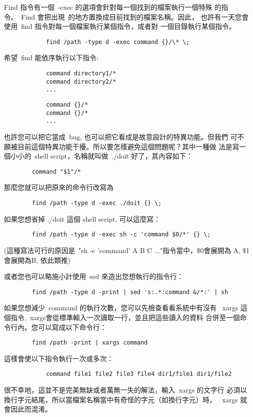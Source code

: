 \documentclass{article}
\begin{document}
\begin{CJK*}{Bg5}{ming}
	Find 指令有一個~-exec 的選項會針對每一個找到的檔案執行一個特殊
        的指令。~Find 會把出現~{}的地方置換成目前找到的檔案名稱。因此，
        也許有一天您會使用~find 指令對每一個檔案執行某個指令，或者對
        一個目錄執行某個指令。
\begin{verbatim}
	        find /path -type d -exec command {}/\* \;
\end{verbatim}
	希望~find 能依序執行以下指令:
\begin{verbatim}
	        command directory1/*
	        command directory2/*
	        ...
\end{verbatim}
\begin{verbatim}
	        command {}/*
	        command {}/*
	        ...
\end{verbatim}
	也許您可以把它當成~bug, 也可以把它看成是故意設計的特異功能。但我們
	可不願被目前這個特異功能干擾。所以要怎樣避免這個問題呢？其中一種做
	法是寫一個小小的~shell script，名稱就叫做~./doit 好了，其內容如下：
\begin{verbatim}
		command "$1"/*
\end{verbatim}
	那麼您就可以把原來的命令行改寫為
\begin{verbatim}
		find /path -type d -exec ./doit {} \;
\end{verbatim}
	如果您想省掉 ./doit 這個 shell script, 可以這麼寫：
\begin{verbatim}
		find /path -type d -exec sh -c 'command $0/*' {} \;
\end{verbatim}
	(這種寫法可行的原因是~"sh -c 'command' A B C ..."指令當中，\$0會展開為
	A, \$1會展開為B, 依此類推)

	或者您也可以略施小計使用~sed 來造出您想執行的指令行：
\begin{verbatim}
		find /path -type d -print | sed 's:.*:command &/*:' | sh
\end{verbatim}
	如果您想減少~command 的執行次數，您可以先檢查看看系統中有沒有 
	~xargs 這個指令,~xargs會從標準輸入一次讀取一行，並且把這些讀入的資料
	合併至一個命令行內。您可以寫成以下命令行：
\begin{verbatim}
		find /path -print | xargs command
\end{verbatim}
	這樣會使以下指令執行一次或多次：
\begin{verbatim}
	        command file1 file2 file3 file4 dir1/file1 dir1/file2
\end{verbatim}
	很不幸地，這並不是完美無缺或者萬無一失的解法，輸入~xargs 的文字行
	必須以換行字元結尾，所以當檔案名稱當中有奇怪的字元（如換行字元）時，
	~xargs 就會因此而混淆。


\end{CJK*}
\end{document}
